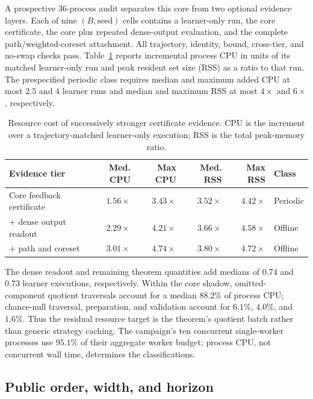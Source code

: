 A prospective 36-process audit separates this core from two optional evidence
layers.  Each of nine $(B,\text{seed})$ cells contains a learner-only run, the
core certificate, the core plus repeated dense-output evaluation, and the
complete path/weighted-coreset attachment.  All trajectory, identity, bound,
cross-tier, and no-swap checks pass.  Table~\ref{tab:app-certificate-resource}
reports incremental process CPU in units of its matched learner-only run and
peak resident set size (RSS) as a ratio to that run.  The prespecified periodic class requires
median and maximum added CPU at most $2.5$ and $4$ learner runs and median and
maximum RSS at most $4\times$ and $6\times$, respectively.

\begin{table}[h]
\caption{Resource cost of successively stronger certificate evidence.  CPU is
the increment over a trajectory-matched learner-only execution; RSS is the
total peak-memory ratio.}
\label{tab:app-certificate-resource}
\centering\footnotesize
\setlength{\tabcolsep}{3.0pt}
\begin{tabular}{@{}lrrrrl@{}}
\toprule
Evidence tier & Med. CPU & Max CPU & Med. RSS & Max RSS & Class \\
\midrule
Core feedback certificate & $1.56\times$ & $3.43\times$ & $3.52\times$ & $4.42\times$ & Periodic \\
$+$ dense output readout & $2.29\times$ & $4.21\times$ & $3.66\times$ & $4.58\times$ & Offline \\
$+$ path and coreset & $3.01\times$ & $4.74\times$ & $3.80\times$ & $4.72\times$ & Offline \\
\bottomrule
\end{tabular}
\end{table}

The dense readout and remaining theorem quantities add medians of $0.74$ and
$0.73$ learner executions, respectively.  Within the core shadow, omitted-
component quotient traversals account for a median $88.2\%$ of process CPU;
chance-null traversal, preparation, and validation account for $6.1\%$,
$4.0\%$, and $1.6\%$.  Thus the residual resource target is the theorem's
quotient batch rather than generic strategy caching.  The campaign's ten
concurrent single-worker processes use $95.1\%$ of their aggregate worker
budget; process CPU, not concurrent wall time, determines the classifications.

\subsection{Public order, width, and horizon}

